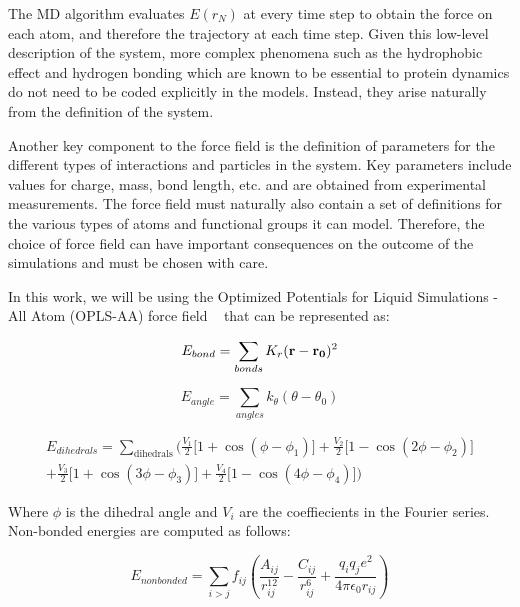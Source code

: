 The MD algorithm evaluates $E(r_{N})$ at every time step to obtain the force on each atom, and therefore the trajectory at each time step. Given this low-level description of the system, more complex phenomena such as the hydrophobic effect and hydrogen bonding which are known to be essential to protein dynamics do not need to be coded explicitly in the models. Instead, they arise naturally from the definition of the system.

Another key component to the force field is the definition of parameters for the different types of interactions and particles in the system. Key parameters include values for charge, mass, bond length, etc. and are obtained from experimental measurements. The force field must naturally also contain a set of definitions for the various types of atoms and functional groups it can model. Therefore, the choice of force field can have important consequences on the outcome of the simulations and must be chosen with care.

In this work, we will be using the Optimized Potentials for Liquid Simulations - All Atom (OPLS-AA) force field ~\cite{jorgensen1988opls} that can be represented as:


\begin{equation}
E_{bond} = \sum_{bonds} K_{r} (\mathbf{r} - \mathbf{r_{0}})^2	
\end{equation}

\begin{equation}
 E_{angle} = \sum_{angles} k_{\theta} (\theta - \theta_0) 
\end{equation}

\begin{multline}
E_{dihedrals} = \sum_\mathrm{dihedrals} \Big( \frac {V_1} {2} \big[ 1 + \cos (\phi-\phi_1) \big] 
                + \frac {V_2} {2} \big[ 1 - \cos (2\phi-\phi_2) \big] \\
                + \frac {V_3} {2} \big[ 1 + \cos (3\phi-\phi_3) \big] 
                + \frac {V_4} {2} \big[ 1 - \cos (4\phi-\phi_4) \big] \Big)
\end{multline}

Where $\phi$ is the dihedral angle and $V_{i}$ are the coeffiecients in the Fourier series. Non-bonded energies are computed as follows:

\begin{equation}
E_{nonbonded} = \sum_{i>j} f_{ij} \left(
                    \frac {A_{ij}}{r_{ij}^{12}} - \frac {C_{ij}}{r_{ij}^6}
                    + \frac {q_iq_j e^2}{4\pi\epsilon_0 r_{ij}} \right)
\end{equation}

